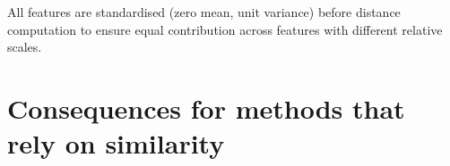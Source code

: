 All features are standardised (zero mean, unit variance) before distance computation to ensure equal contribution across features with different relative scales.



\section{Consequences for methods that rely on similarity}
%
%
%
%

